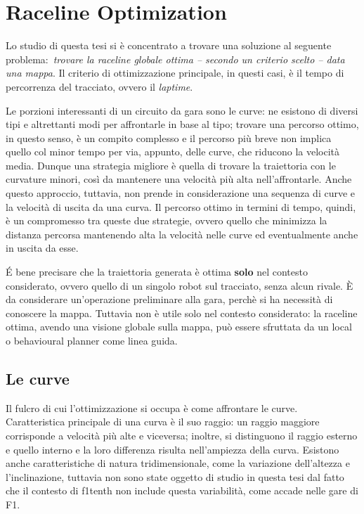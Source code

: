
\chapter{Raceline Optimization}
\label{chap:opt}

Lo studio di questa tesi si è concentrato a trovare una soluzione al seguente problema:\
\textit{trovare la raceline globale ottima \emph{\footnotesize -- secondo un criterio scelto --} data una mappa}.
Il criterio di ottimizzazione principale, in questi casi, è il tempo di percorrenza del tracciato, ovvero
il \textit{laptime}.

Le porzioni interessanti di un circuito da gara sono le curve: ne esistono di diversi tipi e altrettanti
modi per affrontarle in base al tipo; trovare una percorso ottimo, in questo senso, è un compito complesso e
il percorso più breve non implica quello col minor tempo per via, appunto, delle curve, che riducono la
velocità media. Dunque una strategia migliore è quella di trovare la traiettoria con le curvature minori,
così da mantenere una velocità più alta nell'affrontarle. Anche questo approccio, tuttavia, non prende in
considerazione una sequenza di curve e la velocità di uscita da una curva. Il percorso ottimo in termini
di tempo, quindi, è un compromesso tra queste due strategie, ovvero quello che minimizza la distanza
percorsa mantenendo alta la velocità nelle curve ed eventualmente anche in uscita da esse.

É bene precisare che la traiettoria generata è ottima \textbf{solo} nel contesto considerato, ovvero
quello di un singolo robot sul tracciato, senza alcun rivale. È da considerare un'operazione preliminare
alla gara, perchè si ha necessità di conoscere la mappa.
Tuttavia non è utile solo nel contesto considerato: la raceline ottima, avendo una visione globale sulla
mappa, può essere sfruttata da un local o behavioural planner come linea guida.

\section{Le curve}
Il fulcro di cui l'ottimizzazione si occupa è come affrontare le curve.\\
Caratteristica principale di una curva è il suo raggio: un raggio maggiore corrisponde a velocità più alte
e viceversa; inoltre, si distinguono il raggio esterno e quello interno e la loro differenza risulta
nell'ampiezza della curva.
Esistono anche caratteristiche di natura tridimensionale, come la variazione dell'altezza e
l'inclinazione, tuttavia non sono state oggetto di studio in questa tesi dal fatto che il contesto di
f1tenth non include questa variabilità, come accade nelle gare di F1.

